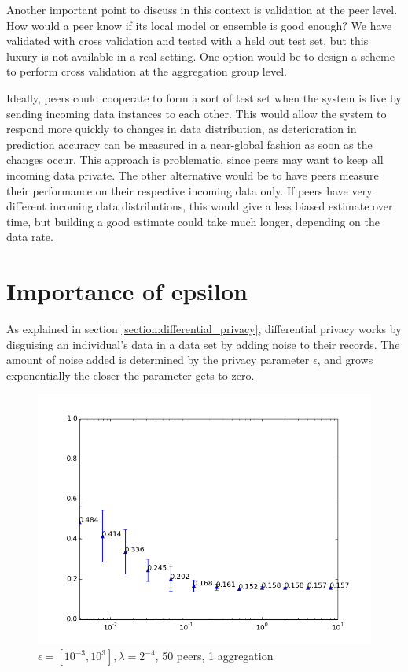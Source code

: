Another important point to discuss in this context is validation at the peer level. How would a peer know if its local model or ensemble is good enough? We have validated with cross validation and tested with a held out test set, but this luxury is not available in a real setting. One option would be to design a scheme to perform cross validation at the aggregation group level.

Ideally, peers could cooperate to form a sort of test set when the system is live by sending incoming data instances to each other. This would allow the system to respond more quickly to changes in data distribution, as deterioration in prediction accuracy can be measured in a near-global fashion as soon as the changes occur. This approach is problematic, since peers may want to keep all incoming data private. The other alternative would be to have peers measure their performance on their respective incoming data only. If peers have very different incoming data distributions, this would give a less biased estimate over time, but building a good estimate could take much longer, depending on the data rate.



\section{Importance of epsilon}
As explained in section \ref{section:differential_privacy}, differential privacy works by disguising an individual's data in a data set by adding noise to their records. The amount of noise added is determined by the privacy parameter  $\epsilon$, and grows exponentially the closer the parameter gets to zero. 

\begin{figure}[H]
	\centering
	\includegraphics[width=\textwidth]{fig/spambase/eps2e-8-2e8,budg=eps,peers10,groups10,reg2e-2-data368-pubAll-spam-baseline-testset}
 	\caption{$\epsilon = [10^{-3}, 10^{3}], \lambda = 2^{-4}$, 50 peers, 1 aggregation}
 	\label{fig:epsilon_big_range}
\end{figure}
 
